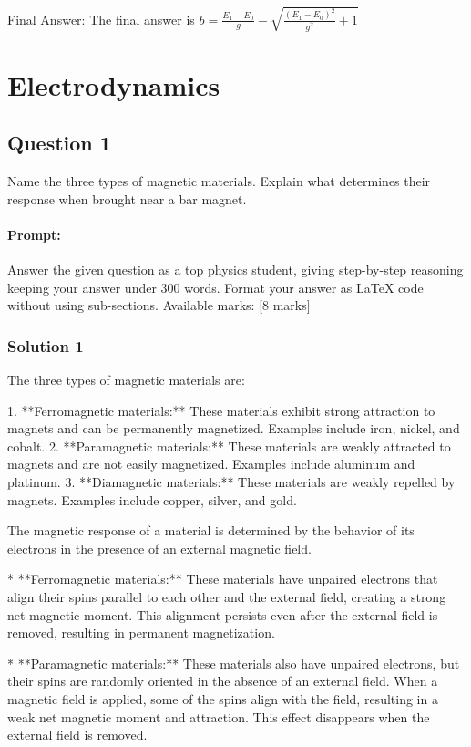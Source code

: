 \documentclass{article}
\begin{document}
Final Answer: The final answer is \(b = \frac{E_1 - E_0}{g} - \sqrt{\frac{(E_1 - E_0)^2}{g^2} + 1}\)


\section{Electrodynamics}

\subsection{Question 1}

Name the three types of magnetic materials. Explain what determines their response when brought near a bar magnet. 

\paragraph{Prompt: \\} 
Answer the given question as a top physics student, giving step-by-step reasoning keeping your answer under 300 words. Format your answer as LaTeX code without using sub-sections. Available marks: [8 marks]

\subsubsection{Solution 1}
The three types of magnetic materials are:

1.  **Ferromagnetic materials:** These materials exhibit strong attraction to magnets and can be permanently magnetized. Examples include iron, nickel, and cobalt.
2.  **Paramagnetic materials:** These materials are weakly attracted to magnets and are not easily magnetized. Examples include aluminum and platinum.
3.  **Diamagnetic materials:** These materials are weakly repelled by magnets. Examples include copper, silver, and gold.

The magnetic response of a material is determined by the behavior of its electrons in the presence of an external magnetic field.

*   **Ferromagnetic materials:** These materials have unpaired electrons that align their spins parallel to each other and the external field, creating a strong net magnetic moment. This alignment persists even after the external field is removed, resulting in permanent magnetization.

*   **Paramagnetic materials:** These materials also have unpaired electrons, but their spins are randomly oriented in the absence of an external field. When a magnetic field is applied, some of the spins align with the field, resulting in a weak net magnetic moment and attraction. This effect disappears when the external field is removed.
\end{document}
